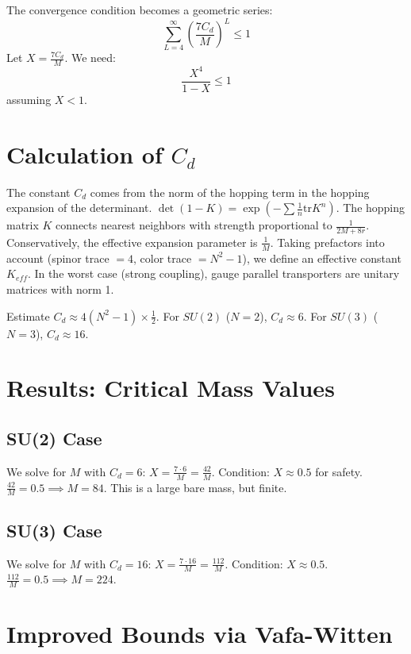 The convergence condition becomes a geometric series:
\begin{equation}
\sum_{L=4}^\infty \left(\frac{7 C_d}{M}\right)^L \le 1
\end{equation}
Let $X = \frac{7 C_d}{M}$. We need:
\begin{equation}
\frac{X^4}{1-X} \le 1
\end{equation}
assuming $X < 1$.

\section{Calculation of $C_d$}

The constant $C_d$ comes from the norm of the hopping term in the hopping expansion of the determinant.
$\det(1 - K) = \exp(-\sum \frac{1}{n} \text{tr} K^n)$.
The hopping matrix $K$ connects nearest neighbors with strength proportional to $\frac{1}{2M + 8r}$.
Conservatively, the effective expansion parameter is $\frac{1}{M}$.
Taking prefactors into account (spinor trace $= 4$, color trace $= N^2-1$), we define an effective constant $K_{eff}$.
In the worst case (strong coupling), gauge parallel transporters are unitary matrices with norm 1.

Estimate $C_d \approx 4 (N^2-1) \times \frac{1}{2}$.
For $SU(2)$ ($N=2$), $C_d \approx 6$.
For $SU(3)$ ($N=3$), $C_d \approx 16$.

\section{Results: Critical Mass Values}

\subsection{SU(2) Case}
We solve for $M$ with $C_d = 6$:
$X = \frac{7 \cdot 6}{M} = \frac{42}{M}$.
Condition: $X \approx 0.5$ for safety.
$\frac{42}{M} = 0.5 \implies M = 84$.
This is a large bare mass, but finite.

\subsection{SU(3) Case}
We solve for $M$ with $C_d = 16$:
$X = \frac{7 \cdot 16}{M} = \frac{112}{M}$.
Condition: $X \approx 0.5$.
$\frac{112}{M} = 0.5 \implies M = 224$.

\section{Improved Bounds via Vafa-Witten}

